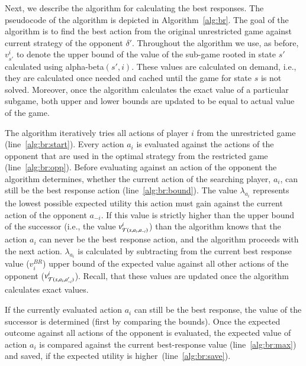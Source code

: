 Next, we describe the algorithm for calculating the best responses. 
The pseudocode of the algorithm is depicted in Algorithm~\ref{alg:br}.
The goal of the algorithm is to find the best action from the original unrestricted game against current strategy of the opponent $\delta'$. 
Throughout the algorithm we use, as before, $v^i_{s'}$ to denote the upper bound of the value of the sub-game rooted in state $s'$ calculated using alpha-beta$(s',i)$. These values are calculated on demand, i.e., they are calculated once needed and cached until the game for state $s$ is not solved.
Moreover, once the algorithm calculates the exact value of a particular subgame, both upper and lower bounds are updated to be equal to actual value of the game. 

The algorithm iteratively tries all actions of player $i$ from the unrestricted game (line~\ref{alg:br:start}). 
Every action $a_i$ is evaluated against the actions of the opponent that are used in the optimal strategy from the restricted game (line~\ref{alg:br:opp}).
Before evaluating against an action of the opponent the algorithm determines, whether the current action of the searching player, $a_i$, can still be the best response action (line~\ref{alg:br:bound}). 
The value $\lambda_{a_i}$ represents the lowest possible expected utility this action must gain against the current action of the opponent $a_{-i}$. 
If this value is strictly higher than the upper bound of the successor (i.e., the value $v^i_{\mathcal{T}(s,a_i,a_{-i})}$) than the algorithm knows that the action $a_i$ can never be the best response action, and the algorithm proceeds with the next action.
$\lambda_{a_i}$ is calculated by subtracting from the current best response value ($v_i^{BR}$) upper bound of the expected value against all other actions of the opponent ($v^i_{\mathcal{T}(s,a_i,a'_{-i})}$). Recall, that these values are updated once the algorithm calculates exact values.

If the currently evaluated action $a_i$ can still be the best response, the value of the successor is determined (first by comparing the bounds). Once the expected outcome against all actions of the opponent is evaluated, the expected value of action $a_i$ is compared against the current best-response value (line~\ref{alg:br:max}) and saved, if the expected utility is higher~(line~\ref{alg:br:save}).


